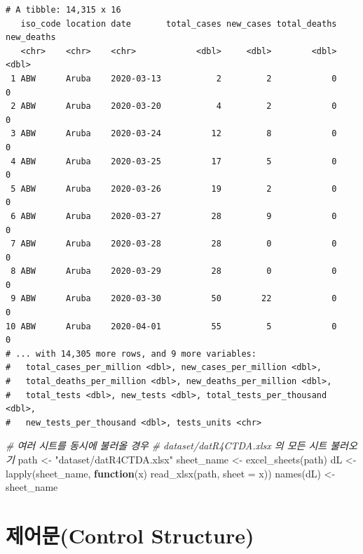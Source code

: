 \documentclass[
  11pt,
]{krantz}
\newenvironment{Shaded}{\begin{snugshade}}{\end{snugshade}}
\newcommand{\AttributeTok}[1]{\textcolor[rgb]{0.61,0.61,0.61}{#1}}
\newcommand{\CommentTok}[1]{\textcolor[rgb]{0.37,0.37,0.37}{\textit{#1}}}
\newcommand{\ControlFlowTok}[1]{\textcolor[rgb]{0.27,0.27,0.27}{\textbf{#1}}}
\newcommand{\FunctionTok}[1]{\textcolor[rgb]{0,0,0}{#1}}
\newcommand{\NormalTok}[1]{#1}
\newcommand{\OtherTok}[1]{\textcolor[rgb]{0.37,0.37,0.37}{#1}}
\newcommand{\StringTok}[1]{\textcolor[rgb]{0.5,0.5,0.5}{#1}}
\begin{document}
\begin{verbatim}
# A tibble: 14,315 x 16
   iso_code location date       total_cases new_cases total_deaths new_deaths
   <chr>    <chr>    <chr>            <dbl>     <dbl>        <dbl>      <dbl>
 1 ABW      Aruba    2020-03-13           2         2            0          0
 2 ABW      Aruba    2020-03-20           4         2            0          0
 3 ABW      Aruba    2020-03-24          12         8            0          0
 4 ABW      Aruba    2020-03-25          17         5            0          0
 5 ABW      Aruba    2020-03-26          19         2            0          0
 6 ABW      Aruba    2020-03-27          28         9            0          0
 7 ABW      Aruba    2020-03-28          28         0            0          0
 8 ABW      Aruba    2020-03-29          28         0            0          0
 9 ABW      Aruba    2020-03-30          50        22            0          0
10 ABW      Aruba    2020-04-01          55         5            0          0
# ... with 14,305 more rows, and 9 more variables:
#   total_cases_per_million <dbl>, new_cases_per_million <dbl>,
#   total_deaths_per_million <dbl>, new_deaths_per_million <dbl>,
#   total_tests <dbl>, new_tests <dbl>, total_tests_per_thousand <dbl>,
#   new_tests_per_thousand <dbl>, tests_units <chr>
\end{verbatim}

\begin{Shaded}
\begin{Highlighting}[]
\CommentTok{\# 여러 시트를 동시에 불러올 경우}
\CommentTok{\# dataset/datR4CTDA.xlsx 의 모든 시트 불러오기}
\NormalTok{path }\OtherTok{\textless{}{-}} \StringTok{"dataset/datR4CTDA.xlsx"}
\NormalTok{sheet\_name }\OtherTok{\textless{}{-}} \FunctionTok{excel\_sheets}\NormalTok{(path)}
\NormalTok{dL }\OtherTok{\textless{}{-}} \FunctionTok{lapply}\NormalTok{(sheet\_name, }\ControlFlowTok{function}\NormalTok{(x) }\FunctionTok{read\_xlsx}\NormalTok{(path, }\AttributeTok{sheet =}\NormalTok{ x))}
\FunctionTok{names}\NormalTok{(dL) }\OtherTok{\textless{}{-}}\NormalTok{ sheet\_name}
\end{Highlighting}
\end{Shaded}

\normalsize

\hypertarget{control-structure}{%
\chapter{제어문(Control Structure)}\label{control-structure}}
\end{document}
